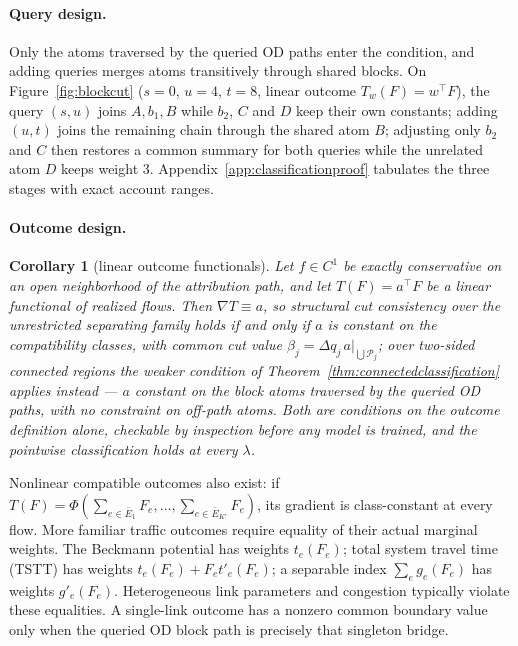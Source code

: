 \documentclass[a4paper,fleqn]{cas-sc}
\newtheorem{corollary}[theorem]{Corollary}
\begin{document}
\paragraph{Query design.}
Only the atoms traversed by the queried OD paths enter the condition, and
adding queries merges atoms transitively through shared blocks. On
Figure~\ref{fig:blockcut} ($s=0$, $u=4$, $t=8$, linear outcome
$T_w(F)=w^\top F$), the query $(s,u)$ joins $A,b_1,B$ while $b_2$, $C$
and $D$ keep their own constants; adding $(u,t)$ joins the remaining
chain through the shared atom $B$; adjusting only $b_2$ and $C$ then
restores a common summary for both queries while the unrelated atom $D$
keeps weight $3$. Appendix~\ref{app:classificationproof} tabulates the
three stages with exact account ranges.

\paragraph{Outcome design.}
\begin{corollary}[linear outcome functionals]\label{cor:linear}
Let $f\in C^1$ be exactly conservative on an open neighborhood of the
attribution path, and let $T(F)=a^\top F$ be a linear functional of
realized flows. Then $\nabla T\equiv a$, so structural cut consistency
over the unrestricted separating family holds if and only if $a$ is
constant on the compatibility classes, with common cut value
$\beta_j=\Delta q_j\,a|_{\bigcup\mathcal{P}_j}$; over two-sided
connected regions the weaker condition of
Theorem~\ref{thm:connectedclassification} applies instead --- $a$
constant on the block atoms traversed by the queried OD paths, with no
constraint on off-path atoms. Both are conditions on the outcome
definition alone, checkable by inspection before any model is trained,
and the pointwise classification holds at every $\lambda$.
\end{corollary}
Nonlinear compatible outcomes also exist: if
$T(F)=\Phi(\sum_{e\in\bar E_1}F_e,\ldots,\sum_{e\in\bar E_{K'}}F_e)$,
its gradient is class-constant at every flow. More familiar traffic outcomes
require equality of their actual marginal weights. The Beckmann potential
has weights $t_e(F_e)$; total system travel time (TSTT) has weights
$t_e(F_e)+F_et'_e(F_e)$; a separable index $\sum_e g_e(F_e)$ has
weights $g'_e(F_e)$. Heterogeneous link parameters and congestion typically
violate these equalities. A single-link outcome has a nonzero common boundary value
only when the queried OD block path is precisely that singleton bridge.
\end{document}
